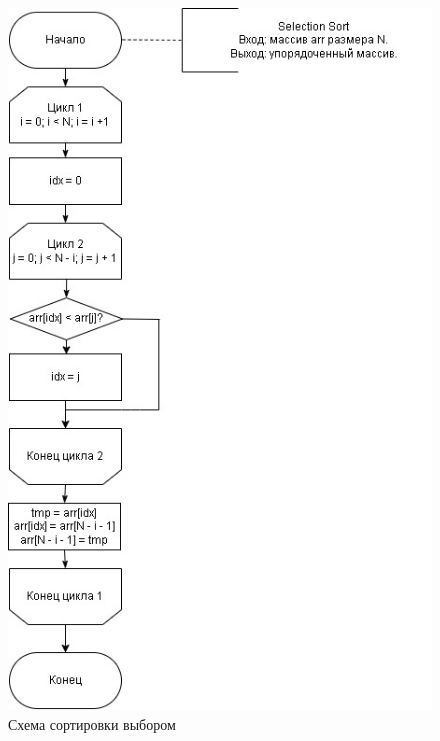 \documentclass[12pt]{report}
\begin{document}
	\begin{figure}[h]
		\centering
		\includegraphics[width=0.9\linewidth]{selection}
		\caption{Схема сортировки выбором}
		\label{fig:schema_selection}
	\end{figure}
	
\end{document}
